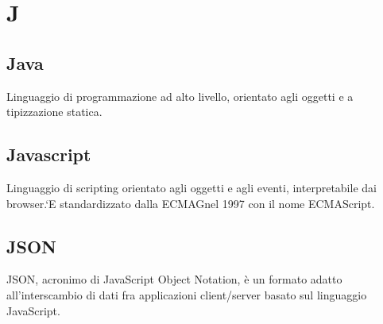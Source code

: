 \section*{J}
\markright{}
\subsection*{Java}
Linguaggio di programmazione ad alto livello, orientato agli oggetti e a tipizzazione statica.
\subsection*{Javascript}
Linguaggio di scripting orientato agli oggetti e agli eventi, interpretabile dai browser.`E standardizzato dalla ECMAGnel 1997 con il nome ECMAScript.
\subsection*{JSON}
JSON, acronimo di JavaScript Object Notation, è un formato adatto all'interscambio di dati fra applicazioni client/server basato sul linguaggio JavaScript.